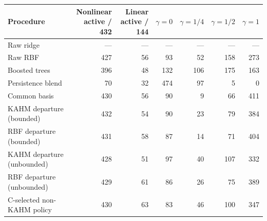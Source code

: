 \begin{tabular}{@{}lrrrrrr@{}}
\toprule
Procedure & \shortstack{Nonlinear\\active / 432} & \shortstack{Linear\\active / 144} & $\gamma=0$ & $\gamma=1/4$ & $\gamma=1/2$ & $\gamma=1$ \\
\midrule
Raw ridge & --- & --- & --- & --- & --- & --- \\
Raw RBF & 427 & 56 & 93 & 52 & 158 & 273 \\
Boosted trees & 396 & 48 & 132 & 106 & 175 & 163 \\
Persistence blend & 70 & 32 & 474 & 97 & 5 & 0 \\
Common basis & 430 & 56 & 90 & 9 & 66 & 411 \\
KAHM departure (bounded) & 432 & 54 & 90 & 23 & 79 & 384 \\
RBF departure (bounded) & 431 & 58 & 87 & 14 & 71 & 404 \\
KAHM departure (unbounded) & 428 & 51 & 97 & 40 & 107 & 332 \\
RBF departure (unbounded) & 429 & 61 & 86 & 26 & 75 & 389 \\
C-selected non-KAHM policy & 430 & 63 & 83 & 46 & 100 & 347 \\
\bottomrule
\end{tabular}

